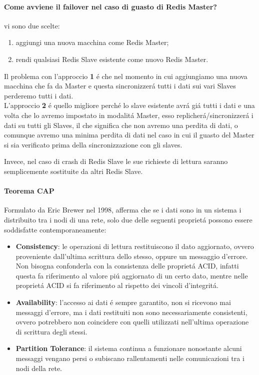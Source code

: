 \paragraph{Come avviene il failover nel caso di guasto di Redis Master?\\}
vi sono due scelte:
\begin{enumerate}
    \item aggiungi una nuova macchina come Redis Master;
    \item rendi qualsiasi Redis Slave esistente come nuovo Redis Master.
\end{enumerate}
Il problema con l'approccio \textbf{1} é che nel momento in cui aggiungiamo una nuova macchina che fa da Master e questa sincronizzerá
tutti i dati sui vari Slaves perderemo tutti i dati.\\
L'approccio \textbf{2} é quello migliore perché lo slave esistente avrá giá tutti i dati e una volta che lo avremo impostato in modalitá
Master, esso replicherá/sincronizzerá i dati su tutti gli Slaves, il che significa che non avremo una perdita di dati, o comunque
avremo una minima perdita di dati nel caso in cui il guasto del Master si sia verificato prima della sincronizzazione con gli slaves.

Invece, nel caso di crash di Redis Slave le sue richieste di lettura saranno semplicemente sostituite da altri Redis Slave.

\paragraph{Teorema CAP\\}
Formulato da Eric Brewer nel 1998, afferma che se i dati sono in un sistema i distribuito tra i nodi di una rete, solo due delle seguenti
proprietá possono essere soddisfatte contemporaneamente:
\begin{itemize}
    \item \textbf{Consistency}: le operazioni di lettura restituiscono il dato aggiornato, ovvero proveniente dall'ultima scrittura dello stesso,
    oppure un messaggio d'errore. Non bisogna confonderla con la consistenza delle proprietá ACID, infatti questa fa riferimento al valore piú aggiornato
    di un certo dato, mentre nelle proprietá ACID si fa riferimento al rispetto dei vincoli d'integritá.
    \item \textbf{Availability}: l'accesso ai dati é sempre garantito, non si ricevono mai messaggi d'errore, ma i dati restituiti non sono necessariamente
    consistenti, ovvero potrebbero non coincidere con quelli utilizzati nell'ultima operazione di scrittura degli stessi.
    \item \textbf{Partition Tolerance}: il sistema continua a funzionare nonostante alcuni messaggi vengano persi o subiscano rallentamenti
    nelle comunicazioni tra i nodi della rete.
\end{itemize}

